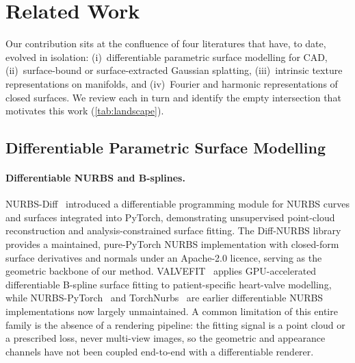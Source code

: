\section{Related Work}\label{sec:related}

Our contribution sits at the confluence of four literatures that have, to
date, evolved in isolation: (i)~differentiable parametric surface modelling
for CAD, (ii)~surface-bound or surface-extracted Gaussian splatting,
(iii)~intrinsic texture representations on manifolds, and
(iv)~Fourier and harmonic representations of closed surfaces. We review
each in turn and identify the empty intersection that motivates this work
(\autoref{tab:landscape}).

\subsection{Differentiable Parametric Surface Modelling}\label{sec:rw:diffcad}

\paragraph{Differentiable NURBS and B-splines.}
NURBS-Diff~\cite{nurbsdiff} introduced a differentiable programming module for
NURBS curves and surfaces integrated into PyTorch, demonstrating unsupervised
point-cloud reconstruction and analysis-constrained surface fitting. The
Diff-NURBS library~\cite{diffnurbs} provides a maintained, pure-PyTorch
NURBS implementation with closed-form surface derivatives and normals under
an Apache-2.0 licence, serving as the geometric backbone of our method.
VALVEFIT~\cite{valvefit} applies GPU-accelerated differentiable B-spline
surface fitting to patient-specific heart-valve modelling, while
NURBS-PyTorch~\cite{nurbspytorch} and TorchNurbs~\cite{torchnurbs} are earlier
differentiable NURBS implementations now largely unmaintained. A common
limitation of this entire family is the absence of a rendering pipeline: the
fitting signal is a point cloud or a prescribed loss, never multi-view
images, so the geometric and appearance channels have not been coupled
end-to-end with a differentiable renderer.


